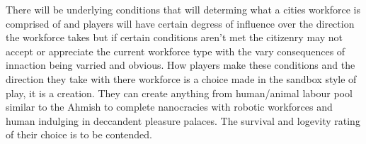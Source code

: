 There will be underlying conditions that will determing what a cities workforce is comprised of and players will have certain degress of influence over the direction the workforce takes but if certain conditions aren't met the citizenry may not accept or appreciate the current workforce type with the vary consequences of innaction being varried and obvious. How players make these conditions and the direction they take with there workforce is a choice made in the sandbox style of play, it is a creation. They can create anything from human/animal labour pool similar to the Ahmish to complete nanocracies with robotic workforces and human indulging in deccandent pleasure palaces. The survival and logevity rating of their choice is to be contended.
